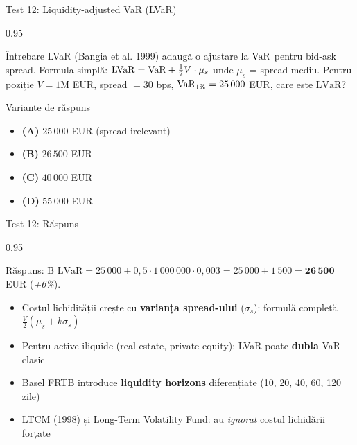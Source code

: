 \documentclass[9pt, aspectratio=169, t]{beamer}
\begin{document}
\begin{frame}[shrink=10]{Test 12: Liquidity-adjusted VaR (LVaR)}
    \begin{cminipage}{0.95\textwidth}
    \begin{alertblock}{Întrebare}
    LVaR (Bangia et al. 1999) adaugă o ajustare la $\text{VaR}$ pentru bid-ask spread. Formula simplă: $\mathrm{LVaR} = \text{VaR} + \frac{1}{2}V \cdot \mu_s$ unde $\mu_s$ = spread mediu. Pentru poziție $V = 1$M EUR, spread $= 30$ bps, $\text{VaR}_{1\%} = 25\,000$ EUR, care este $\mathrm{LVaR}$?
    \end{alertblock}
    \begin{block}{Variante de răspuns}
    \begin{itemize}\setlength{\itemsep}{0pt}
        \item \textbf{(A)} $25\,000$ EUR (spread irelevant)
        \item \textbf{(B)} $26\,500$ EUR
        \item \textbf{(C)} $40\,000$ EUR
        \item \textbf{(D)} $55\,000$ EUR
    \end{itemize}
    \end{block}
    \end{cminipage}
\end{frame}

\begin{frame}[shrink=10]{Test 12: Răspuns}
    \begin{cminipage}{0.95\textwidth}
    \begin{exampleblock}{Răspuns: B}
    $\mathrm{LVaR} = 25\,000 + 0{,}5 \cdot 1\,000\,000 \cdot 0{,}003 = 25\,000 + 1\,500 = \mathbf{26\,500}$ EUR (\textit{+6\%}).
    \end{exampleblock}
    \begin{itemize}\setlength{\itemsep}{0pt}
        \item Costul lichidității crește cu \textbf{varianța spread-ului} ($\sigma_s$): formulă completă $\frac{V}{2}(\mu_s + k \sigma_s)$
        \item Pentru active iliquide (real estate, private equity): LVaR poate \textbf{dubla} VaR clasic
        \item Basel FRTB introduce \textbf{liquidity horizons} diferențiate (10, 20, 40, 60, 120 zile)
        \item LTCM (1998) și Long-Term Volatility Fund: au \emph{ignorat} costul lichidării forțate
    \end{itemize}
    \end{cminipage}
\end{frame}
\end{document}
